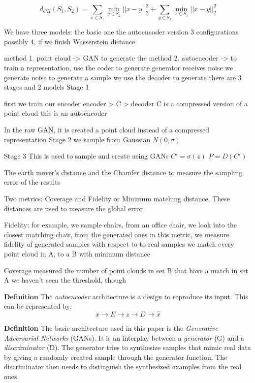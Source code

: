 \documentclass[12pt]{article}
\newcommand{\TODO}[2]{{#2}}
\begin{document}
    \[
        d_{CH}(S_{1}, S_{2}) = \sum_{x \in S_{1}} \min _{y \in S_{2}} || x - y||_{2}^{2} +
        \sum_{y \in S_{2}} \min_{x \in S_{1}} ||x - y||_{2}^{2}
    \]


    \TODO{Rephrase this part}{
        We have three models:
        the basic one
        the autoencoder version
        3 configurations possibly 4, if we finish Wasserstein distance

        method 1. point cloud -> GAN to generate the
        method 2. autoencoder -> to train a representation, use the coder to generate
        generator receives noise
        we generate noise to generate a sample
        we use the decoder to generate
        there are 3 stages and 2 models
        Stage 1

        first we train our encoder
        encoder > C > decoder
        C is a compressed version of a point cloud
        this is an autoencoder

        In the raw GAN, it is created a point cloud instead of a compressed representation
        Stage 2
        we sample from Gaussian $N(0,\sigma)$


        Stage 3
        This is used to sample and create using GANs
        $C' = \sigma(z)$
        $P = D(C')$


        The earth mover's distance and the Chamfer distance to measure the sampling error of the results

        Two metrics: Coverage and Fidelity or Minimum matching distance,
        These distances are used to measure the global error

        Fidelity: for example, we sample chairs,
        from an office chair, we look into the closest matching chair, from the generated ones
        in this metric, we measure fidelity of generated samples with respect to to real samples
        we match every point cloud in A, to a B with minimum distance

        Coverage measured the number of point clouds in set B that have a match in set A
        we haven't seen the threshold, though
    }

    \textbf{Definition} The \emph{autoencoder} architecture is a design to reproduce its input.
    This can be represented by:
    \[ x \to E \to z \to D \to \hat{x} \]

    \textbf{Definition} The basic architecture used in this paper is the \emph{Generative Adversarial Networks} (GANs).
    It is an interplay between a \emph{generator} (G) and a \emph{discriminator} (D).
    The generator tries to synthesize samples that mimic real data by giving a randomly created sample through the generator function.
    The discriminator then needs to distinguish the synthesized examples from the real ones.
\end{document}
